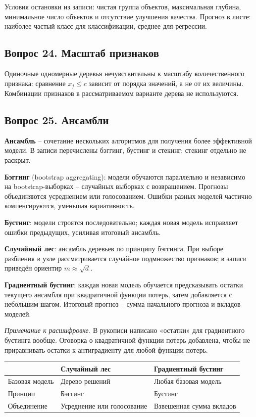 \documentclass[11pt,a4paper]{article}
\newcommand{\ednote}[1]{\par{\small\color{muted}\textit{Примечание к расшифровке.} #1}\par}
\newcommand{\question}[2]{\subsection{Вопрос #1. #2}}
\begin{document}
Условия остановки из записи: чистая группа объектов, максимальная глубина,
минимальное число объектов и отсутствие улучшения качества.
Прогноз в листе: наиболее частый класс для классификации, среднее для регрессии.

\question{24}{Масштаб признаков}
Одиночные одномерные деревья нечувствительны к масштабу количественного признака:
сравнение $x_j\le c$ зависит от порядка значений, а не от их величины.
Комбинации признаков в рассматриваемом варианте дерева не используются.

\question{25}{Ансамбли}
\textbf{Ансамбль} -- сочетание нескольких алгоритмов для получения более
эффективной модели. В записи перечислены бэггинг, бустинг и стекинг;
стекинг отдельно не раскрыт.

\textbf{Бэггинг} (bootstrap aggregating): модели обучаются параллельно
и независимо на bootstrap-выборках -- случайных выборках с возвращением.
Прогнозы объединяются усреднением или голосованием.
Ошибки разных моделей частично компенсируются, уменьшая вариативность.

\textbf{Бустинг}: модели строятся последовательно; каждая новая модель
исправляет ошибки предыдущих, усиливая итоговый ансамбль.

\textbf{Случайный лес}: ансамбль деревьев по принципу бэггинга.
При выборе разбиения в узле рассматривается случайное подмножество признаков;
в записи приведён ориентир $m\approx\sqrt d$.

\textbf{Градиентный бустинг}: каждая новая модель обучается предсказывать
остатки текущего ансамбля при квадратичной функции потерь, затем добавляется
с небольшим шагом. Итоговый прогноз -- сумма начального прогноза и вкладов моделей.
\ednote{В рукописи написано «остатки» для градиентного бустинга вообще.
Оговорка о квадратичной функции потерь добавлена, чтобы не приравнивать
остатки к антиградиенту для любой функции потерь.}

\begin{tabularx}{\linewidth}{@{}lYY@{}}
\toprule
 & Случайный лес & Градиентный бустинг\\
\midrule
Базовая модель & Дерево решений & Любая базовая модель\\
Принцип & Бэггинг & Бустинг\\
Объединение & Усреднение или голосование & Взвешенная сумма вкладов\\
\bottomrule
\end{tabularx}
\end{document}
